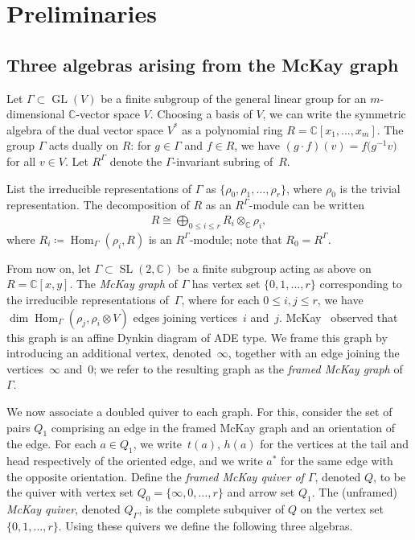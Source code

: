 \documentclass[11pt]{article}
\numberwithin{equation}{section}
\newcommand{\SC}{\mathbb{C}} %
\newcommand{\GL}{\operatorname{GL}}
\newcommand{\Hom}{\operatorname{Hom}}
\newcommand{\SL}{\operatorname{SL}}
\numberwithin{equation}{section}
\begin{document}
\section{Preliminaries}\label{sec:prelim}

\subsection{Three algebras arising from the McKay graph}\label{subsec:mckay}
Let $\Gamma\subset \GL(V)$ be a finite subgroup of the general linear group for an $m$-dimensional $\SC$-vector space $V$.
Choosing a basis of $V$, we can write the symmetric algebra of the dual vector space $V^*$ as a polynomial ring $R=\SC[x_1,\dots,x_m]$. The group $\Gamma$ acts dually on $R$: for $g\in \Gamma$ and $f\in R$, we have $(g\cdot f)(v) = f\big(g^{-1} v\big)$ for all $v\in V$. Let $R^\Gamma$ denote the $\Gamma$-invariant subring of~$R$.

List the irreducible representations of $\Gamma$ as $\{\rho_0, \rho_1, \dots, \rho_r\}$, where $\rho_0$ is the trivial representation.
The decomposition of $R$ as an $R^\Gamma$-module can be written \cite[Proposition~4.1.15]{goodman2009symmetry}
 \begin{gather*} %
 R\cong \bigoplus_{0\leq i\leq r} R_i\otimes_\mathbb{C} \rho_i,
 \end{gather*}
 where $R_i\coloneqq \Hom_\Gamma(\rho_i,R)$ is an
 $R^\Gamma$-module; note that $R_0=R^{\Gamma}$.

From now on, let $\Gamma \subset \SL(2,\SC)$ be a finite subgroup acting as above on $R=\SC[x,y]$. The \emph{McKay graph} of $\Gamma$
has vertex set $\{0,1, \dots, r\}$ corresponding to the irreducible representations of~$\Gamma$, where for each $0\leq i, j\leq r$, we have $\dim\Hom_{\Gamma}(\rho_j , \rho_i \otimes V )$ edges joining vertices~$i$ and~$j$. McKay~\cite{McKay80} observed that this graph is an affine Dynkin diagram of ADE type. We frame this graph by introducing an additional vertex, denoted~$\infty$, together with an edge joining the vertices~$\infty$ and~$0$; we refer to the resulting graph as the \emph{framed McKay graph} of~$\Gamma$.

We now associate a doubled quiver to each graph. For this, consider
the set of pairs $Q_1$ comprising an edge in the framed McKay graph
and an orientation of the edge. For each $a\in Q_1$, we write~$t(a)$,
$h(a)$ for the vertices at the tail and head respectively of
the oriented edge, and we write $a^{\ast}$ for the same edge with
the opposite orientation. Define the \emph{framed McKay quiver of $\Gamma$},
denoted $Q$, to be the quiver with vertex set $Q_0= \{\infty,0,\dots ,r\}$
and arrow set $Q_1$. The (unframed) \emph{McKay quiver},
denoted $Q_\Gamma$, is the complete subquiver of $Q$ on
the vertex set $\{0, 1,\dots, r\}$. Using these quivers
we define the following three algebras.
\end{document}
